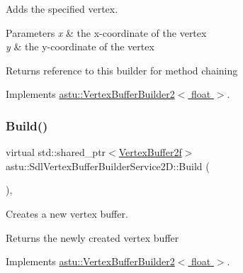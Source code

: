 Adds the specified vertex.


\begin{DoxyParams}{Parameters}
{\em x} & the x-\/coordinate of the vertex \\
\hline
{\em y} & the y-\/coordinate of the vertex \\
\hline
\end{DoxyParams}
\begin{DoxyReturn}{Returns}
reference to this builder for method chaining 
\end{DoxyReturn}


Implements \hyperlink{classastu_1_1VertexBufferBuilder2_ab96f2f382b9f855ead02ed2cd1391147}{astu\+::\+Vertex\+Buffer\+Builder2$<$ float $>$}.

\mbox{\label{classastu_1_1SdlVertexBufferBuilderService2D_ad1825ce136ba0b4e8ef53fba3266f3af}} 
\subsubsection{\texorpdfstring{Build()}{Build()}}
{\footnotesize\ttfamily virtual std\+::shared\+\_\+ptr$<$\hyperlink{group__gfx__group_ga081cf45a441eef100dfbb1e0f64c3826}{Vertex\+Buffer2f}$>$ astu\+::\+Sdl\+Vertex\+Buffer\+Builder\+Service2\+D\+::\+Build (\begin{DoxyParamCaption}{ }\end{DoxyParamCaption})\hspace{0.3cm}{\ttfamily [override]}, {\ttfamily [virtual]}}

Creates a new vertex buffer.

\begin{DoxyReturn}{Returns}
the newly created vertex buffer 
\end{DoxyReturn}


Implements \hyperlink{classastu_1_1VertexBufferBuilder2_a69ce65106844f82fcc34632bfa0d6450}{astu\+::\+Vertex\+Buffer\+Builder2$<$ float $>$}.

\mbox{\label{classastu_1_1SdlVertexBufferBuilderService2D_a82b6c9eaeff1583edc3e42e6b1857b70}} 
